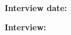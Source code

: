 \vspace{1cm}

\interviewcontext \\[0.5cm]

{
\center
{\large \textbf{Interview date:} \interviewdate}
\\[0.25cm]
}


\HRule

{
\center
\vspace{0.5cm}
{\LARGE \textbf{Interview:}}
\\[1cm]

}

